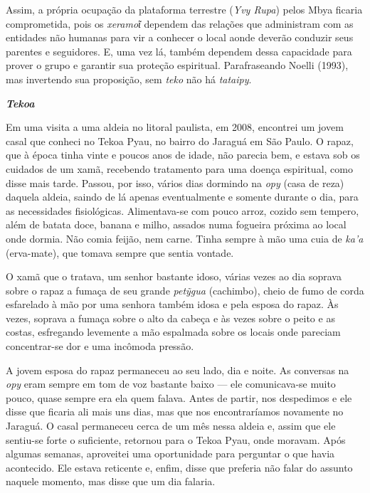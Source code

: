 Assim, a própria ocupação da plataforma terrestre (\emph{Yvy Rupa})
pelos Mbya ficaria comprometida, pois os \emph{xeramoῖ} dependem das
relações que administram com as entidades não humanas para vir a
conhecer o local aonde deverão conduzir seus parentes e seguidores. E,
uma vez lá, também dependem dessa capacidade para prover o grupo e
garantir sua proteção espiritual. Parafraseando Noelli (1993), mas
invertendo sua proposição, sem \emph{teko} não há \emph{tataipy}.

\emph{\textbf{Tekoa}}

Em uma visita a uma aldeia no litoral paulista, em 2008, encontrei um
jovem casal que conheci no Tekoa Pyau, no bairro do Jaraguá em São
Paulo. O rapaz, que à época tinha vinte e poucos anos de idade, não
parecia bem, e estava sob os cuidados de um xamã, recebendo tratamento
para uma doença espiritual, como disse mais tarde. Passou, por isso,
vários dias dormindo na \emph{opy} (casa de reza) daquela aldeia, saindo
de lá apenas eventualmente e somente durante o dia, para as necessidades
fisiológicas. Alimentava-se com pouco arroz, cozido sem tempero, além de
batata doce, banana e milho, assados numa fogueira próxima ao local onde
dormia. Não comia feijão, nem carne. Tinha sempre à mão uma cuia de
\emph{ka'a} (erva-mate), que tomava sempre que sentia vontade.

O xamã que o tratava, um senhor bastante idoso, várias vezes ao dia
soprava sobre o rapaz a fumaça de seu grande \emph{petỹgua} (cachimbo),
cheio de fumo de corda esfarelado à mão por uma senhora também idosa e
pela esposa do rapaz. Às vezes, soprava a fumaça sobre o alto da cabeça
e às vezes sobre o peito e as costas, esfregando levemente a mão
espalmada sobre os locais onde pareciam concentrar-se dor e uma incômoda
pressão.

A jovem esposa do rapaz permaneceu ao seu lado, dia e noite. As
conversas na \emph{opy} eram sempre em tom de voz bastante baixo --- ele
comunicava-se muito pouco, quase sempre era ela quem falava. Antes de
partir, nos despedimos e ele disse que ficaria ali mais uns dias, mas
que nos encontraríamos novamente no Jaraguá. O casal permaneceu cerca de
um mês nessa aldeia e, assim que ele sentiu-se forte o suficiente,
retornou para o Tekoa Pyau, onde moravam. Após algumas semanas,
aproveitei uma oportunidade para perguntar o que havia acontecido. Ele
estava reticente e, enfim, disse que preferia não falar do assunto
naquele momento, mas disse que um dia falaria.

